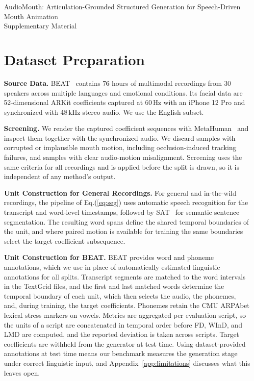 \begin{center}
{\Large AudioMouth: Articulation-Grounded Structured Generation for Speech-Driven Mouth Animation\\[0.4em]
Supplementary Material}
\end{center}

\section{Dataset Preparation}
\label{app:dataset}

\noindent\textbf{Source Data.}\quad
BEAT~\citep{liu2022beat} contains 76 hours of multimodal recordings from 30 speakers across multiple languages and emotional conditions. Its facial data are 52-dimensional ARKit coefficients captured at 60\,Hz with an iPhone 12 Pro and synchronized with 48\,kHz stereo audio. We use the English subset.

\noindent\textbf{Screening.}\quad
We render the captured coefficient sequences with MetaHuman~\citep{metahuman} and inspect them together with the synchronized audio. We discard samples with corrupted or implausible mouth motion, including occlusion-induced tracking failures, and samples with clear audio-motion misalignment. Screening uses the same criteria for all recordings and is applied before the split is drawn, so it is independent of any method's output.

\noindent\textbf{Unit Construction for General Recordings.}\quad
For general and in-the-wild recordings, the pipeline of Eq.(\ref{eq:seg}) uses automatic speech recognition for the transcript and word-level timestamps, followed by SAT~\citep{frohmann2024segment} for semantic sentence segmentation. The resulting word spans define the shared temporal boundaries of the unit, and where paired motion is available for training the same boundaries select the target coefficient subsequence.

\noindent\textbf{Unit Construction for BEAT.}\quad
BEAT provides word and phoneme annotations, which we use in place of automatically estimated linguistic annotations for all splits. Transcript segments are matched to the word intervals in the TextGrid files, and the first and last matched words determine the temporal boundary of each unit, which then selects the audio, the phonemes, and, during training, the target coefficients. Phonemes retain the CMU ARPAbet lexical stress markers on vowels. Metrics are aggregated per evaluation script, so the units of a script are concatenated in temporal order before FD, WInD, and LMD are computed, and the reported deviation is taken across scripts. Target coefficients are withheld from the generator at test time. Using dataset-provided annotations at test time means our benchmark measures the generation stage under correct linguistic input, and Appendix~\ref{app:limitations} discusses what this leaves open.

